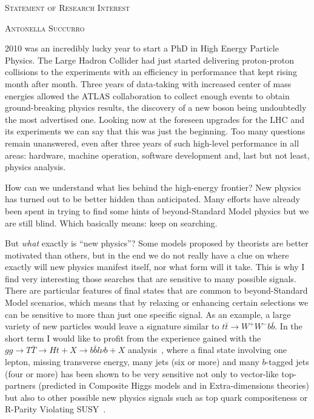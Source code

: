 \documentclass[a4paper,10pt]{article}
\begin{document}
\begin{center}
\LARGE\color{myblue}
\textsc{Statement of Research Interest}
\end{center}

\begin{flushright}
\Large
\textsc{Antonella Succurro}
\end{flushright}

2010 was an incredibly lucky year to start a PhD in High Energy Particle Physics. The Large Hadron Collider had just started delivering 
proton-proton collisions to the experiments with an efficiency in performance that kept rising month after month. Three years of data-taking
with increased center of mass energies allowed the ATLAS collaboration to collect enough events to obtain ground-breaking physics results, the discovery
of a new boson being undoubtedly the most advertised one. Looking now at the foreseen upgrades for the LHC and its experiments we
can say that this was just the beginning. Too many questions remain unanswered, even after three years of such high-level performance
in all areas: hardware, machine operation, software development and, last but not least, physics analysis.

How can we understand what lies behind the high-energy frontier? New physics has turned out to be better hidden than anticipated.
Many efforts have already been spent in trying to find some hints of beyond-Standard Model physics but we are still blind.
Which basically means: keep on searching.


But \textit{what} exactly is ``new physics''? Some models proposed by theorists are better motivated than others, 
but in the end we do not really have a clue on where exactly will new physics manifest itself, nor what form will it take. This is why
I find very interesting those searches that are sensitive to many possible signals. There are particular features
of final states that are common to beyond-Standard Model scenarios, which means that by relaxing or enhancing certain
selections we can be sensitive to more than just one specific signal. As an example, a large variety of new particles
would leave a signature similar to $t\bar{t}\to W^+W^-b\bar{b}$. In the short term I would like to profit from the experience
gained with the $gg\to T\bar{T}\to Ht+X\to b\bar{b}l\nu b +X$ analysis~\cite{ATLAS-CONF-2013-018}, where a final state 
involving one lepton, missing transverse energy, many jets (six or more) and many
$b$-tagged jets (four or more) has been shown to be very sensitive not only to vector-like top-partners 
(predicted in Composite Higgs models and in Extra-dimensions theories) but also to other possible new physics signals such as
top quark compositeness or R-Parity Violating SUSY~\cite[p.17,22]{Yevgeny}.
\end{document}
